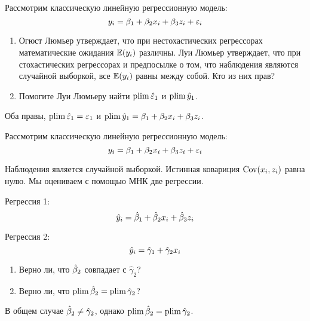 \begin{problem}
Рассмотрим классическую линейную регрессионную модель:
\[
y_i = \beta_1 + \beta_2 x_i + \beta_3 z_i + \varepsilon_i
\]

\begin{enumerate}
\item Огюст Люмьер утверждает, что при нестохастических регрессорах математические ожидания $\mathbb{E}(y_i)$ различны. Луи Люмьер утверждает, что при стохастических регрессорах и предпосылке о том, что наблюдения являются случайной выборкой, все $\mathbb{E}(y_i)$ равны между собой. Кто из них прав?
\item Помогите Луи Люмьеру найти $\operatorname*{plim} \hat{\varepsilon}_1$ и $\operatorname*{plim} \hat{y}_1$.
\end{enumerate}

\begin{sol}
Оба правы, $\operatorname*{plim} \hat{\varepsilon}_1 = \varepsilon_1$ и $\operatorname*{plim} \hat{y}_1= \beta_1 + \beta_2 x_i + \beta_3 z_i$.
\end{sol}
\end{problem}


\begin{problem}
Рассмотрим классическую линейную регрессионную модель:
\[
y_i = \beta_1 + \beta_2 x_i + \beta_3 z_i + \varepsilon_i
\]

Наблюдения является случайной выборкой. Истинная ковариция $\operatorname{Cov}(x_i, z_i)$ равна нулю. Мы оцениваем с помощью МНК две регрессии.

Регрессия 1:
\[
\hat{y}_i = \hat{\beta}_1 + \hat{\beta}_2 x_i + \hat{\beta}_3 z_i
\]

Регрессия 2:
\[
\hat{y}_i = \hat \gamma_1 + \hat \gamma_2 x_i
\]

\begin{enumerate}
\item Верно ли, что $\hat{\beta}_2$ совпадает с $\hat \gamma_2$?
\item Верно ли, что $\operatorname*{plim} \hat{\beta}_2 = \operatorname*{plim} \hat \gamma_2$?
\end{enumerate}

\begin{sol}
В общем случае $\hat{\beta}_2 \neq \hat \gamma_2$, однако $\operatorname*{plim} \hat{\beta}_2 = \operatorname*{plim} \hat \gamma_2$.
\end{sol}
\end{problem}


